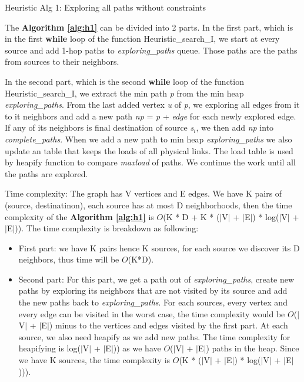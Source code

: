 \begin{algorithm}[!htp]
\caption{Heuristic Alg 1: Exploring all paths without constraints}
\label{alg:h1}

\end{algorithm}

The \textbf{Algorithm \ref{alg:h1}} can be divided into 2 parts. In the first part, which is in the first \textbf{while} loop of the function Heuristic\_search\_I, we start at every source and add 1-hop paths to \textit{exploring\_paths} queue. Those paths are the paths from sources to their neighbors. 

In the second part, which is the second \textbf{while} loop of the function Heuristic\_search\_I, we extract the min path \textit{p} from the min heap \textit{exploring\_paths}. From the last added vertex \textit{u} of \textit{p}, we exploring all edges from it to it neighbors and add a new path \textit{np} = \textit{p} + \textit{edge} for each newly explored edge. If any of its neighbors is final destination of source \textit{s$_i$}, we then add \textit{np} into \textit{complete\_paths}. When we add a new path to min heap \textit{exploring\_paths} we also update an table that keeps the loads of all physical links. The load table is used by heapify function to compare \textit{maxload} of paths. We continue the work until all the paths are explored.

Time complexity: The graph has V vertices and E edges. We have K pairs of (source, destinatinon), each source has at most D neighborhoods, then the time complexity of the \textbf{Algorithm \ref{alg:h1}} is $O$(K * D + K * ($|$V$|$ + $|$E$|$) * log($|$V$|$ + $|$E$|$)). The time complexity is breakdown as following:
\begin{itemize}
\item First part: we have K pairs hence K sources, for each source we discover its D neighbors, thus time will be $O$(K*D).
\item Second part: For this part, we get a path out of \textit{exploring\_paths}, create new paths by exploring its neighbors that are not visited by its source and add the new paths back to \textit{exploring\_paths}. For each sources, every vertex and every edge can be visited in the worst case, the time complexity would be $O$($|$V$|$ + $|$E$|$) minus to the vertices and edges visited by the first part. At each source, we also need heapify as we add new paths. The time complexity for heapifying is log($|$V$|$ + $|$E$|$)) as we have $O$($|$V$|$ + $|$E$|$) paths in the heap. Since we have K sources, the time complexity is $O$(K * ($|$V$|$ + $|$E$|$) * log($|$V$|$ + $|$E$|$))).
\end{itemize}

